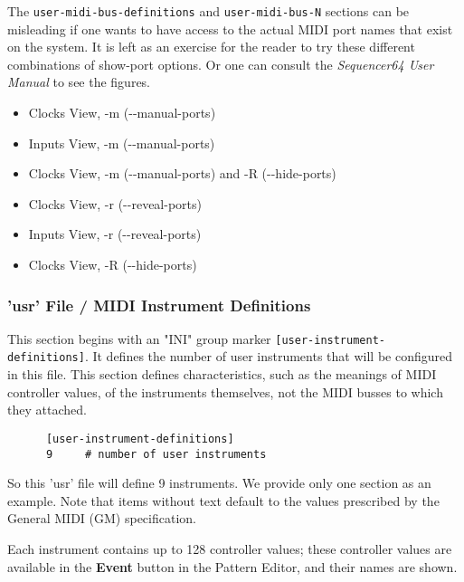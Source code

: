    The \texttt{user-midi-bus-definitions} and \texttt{user-midi-bus-N} sections
   can be misleading if one wants to have access to the
   actual MIDI port names that exist on the system.
   It is left as an exercise for the reader to try these different combinations
   of show-port options.  Or one can consult the \textsl{Sequencer64 User
   Manual} to see the figures.

   \begin{itemize}
      \item Clocks View, -m (-{}-manual-ports)
      \item Inputs View, -m (-{}-manual-ports)
      \item Clocks View, -m (-{}-manual-ports) and -R (-{}-hide-ports)
      \item Clocks View, -r (-{}-reveal-ports)
      \item Inputs View, -r (-{}-reveal-ports)
      \item Clocks View, -R (-{}-hide-ports)
   \end{itemize}

\subsubsection{'usr' File / MIDI Instrument Definitions}
\label{subsubsec:usr_file_midi_instrument_definitions}

   This section begins with an
   "INI" group marker \texttt{[user-instrument-definitions]}.
   It defines the number of user instruments that will be configured in this
   file.  This section defines characteristics, such as
   the meanings of MIDI controller values, of the instruments themselves,
   not the MIDI busses to which they attached.

   \begin{verbatim}
      [user-instrument-definitions]
      9     # number of user instruments
   \end{verbatim}

   So this 'usr' file will define 9 instruments.  We provide only one section
   as an example.  Note that items without text default to the values
   prescribed by the General MIDI (GM) specification.

   Each instrument contains up
   to 128 controller values; these controller values are available in the
   \textbf{Event} button in the Pattern Editor, and their names are shown.

